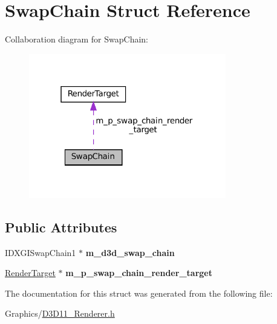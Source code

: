\hypertarget{structSwapChain}{}\section{Swap\+Chain Struct Reference}
\label{structSwapChain}


Collaboration diagram for Swap\+Chain\+:
\nopagebreak
\begin{figure}[H]
\begin{center}
\leavevmode
\includegraphics[width=244pt]{structSwapChain__coll__graph}
\end{center}
\end{figure}
\subsection*{Public Attributes}
\begin{DoxyCompactItemize}
\item 
\mbox{\label{structSwapChain_a1e4a9d0fcd268451355fcea6315115c5}} 
I\+D\+X\+G\+I\+Swap\+Chain1 $\ast$ {\bfseries m\+\_\+d3d\+\_\+swap\+\_\+chain}
\item 
\mbox{\label{structSwapChain_af142fbeb3816afa679981b065b2091d2}} 
\hyperlink{classRenderTarget}{Render\+Target} $\ast$ {\bfseries m\+\_\+p\+\_\+swap\+\_\+chain\+\_\+render\+\_\+target}
\end{DoxyCompactItemize}


The documentation for this struct was generated from the following file\+:\begin{DoxyCompactItemize}
\item 
Graphics/\hyperlink{D3D11__Renderer_8h}{D3\+D11\+\_\+\+Renderer.\+h}\end{DoxyCompactItemize}
